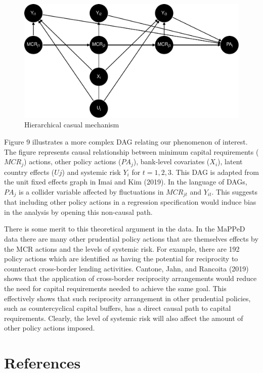 \documentclass[
  10pt,
]{article}
\begin{document}
\begin{figure}[H]
\includegraphics{figures/paper-panel_dag-1} \caption{Hierarchical casual mechanism}\label{fig:panel_dag}
\end{figure}

Figure 9 illustrates a more complex DAG relating our phenomenon of
interest. The figure represents causal relationship between minimum
capital requirements (\(MCR_j\)) actions, other policy actions
(\(PA_j\)), bank-level covariates (\(X_i\)), latent country effects
(\(Uj\)) and systemic risk \(Y_i\) for \(t=1,2,3\). This DAG is adapted
from the unit fixed effects graph in Imai and Kim (2019). In the
language of DAGs, \(PA_j\) is a collider variable affected by
fluctuations in \(MCR_{jt}\) and \(Y_{it}\). This suggests that
including other policy actions in a regression specification would
induce bias in the analysis by opening this non-causal path.

There is some merit to this theoretical argument in the data. In the
MaPPeD data there are many other prudential policy actions that are
themselves effects by the MCR actions and the levels of systemic risk.
For example, there are 192 policy actions which are identified as having
the potential for reciprocity to counteract cross-border lending
activities. Cantone, Jahn, and Rancoita (2019) shows that the
application of cross-border reciprocity arrangements would reduce the
need for capital requirements needed to achieve the same goal. This
effectively shows that such reciprocity arrangement in other prudential
policies, such as countercyclical capital buffers, has a direct causal
path to capital requirements. Clearly, the level of systemic risk will
also affect the amount of other policy actions imposed.

\hypertarget{references}{%
\section{References}\label{references}}
\end{document}
